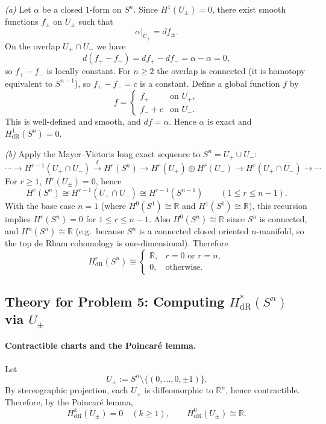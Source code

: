 \documentclass[12pt,a4paper]{article}
\theoremstyle{plain}
\theoremstyle{definition}      %
\begin{document}
	\smallskip
	\textit{(a)} Let $\alpha$ be a closed $1$-form on $S^n$. Since $H^1(U_\pm)=0$,
	there exist smooth functions $f_\pm$ on $U_\pm$ such that
	\[
	\alpha|_{U_\pm}=df_\pm.
	\]
	On the overlap $U_+\cap U_-$ we have
	\[
	d(f_+-f_-)=df_+-df_-=\alpha-\alpha=0,
	\]
	so $f_+-f_-$ is locally constant. For $n\ge 2$ the overlap is connected (it is homotopy equivalent to $S^{n-1}$),
	so $f_+-f_-=c$ is a constant. Define a global function $f$ by
	\[
	f=
	\begin{cases}
		f_+ & \text{on }U_+,\\
		f_-+c & \text{on }U_-.
	\end{cases}
	\]
	This is well-defined and smooth, and $df=\alpha$. Hence $\alpha$ is exact and $H^1_{\mathrm{dR}}(S^n)=0$.
	
	\smallskip
	\textit{(b)} Apply the Mayer--Vietoris long exact sequence to $S^n=U_+\cup U_-$:
	\[
	\cdots \to H^{r-1}(U_+\cap U_-)\xrightarrow{\delta}
	H^r(S^n)\to H^r(U_+)\oplus H^r(U_-)\to H^r(U_+\cap U_-)\to \cdots
	\]
	For $r\ge 1$, $H^r(U_\pm)=0$, hence
	\[
	H^r(S^n)\cong H^{r-1}(U_+\cap U_-)\cong H^{r-1}(S^{n-1})
	\qquad (1\le r\le n-1).
	\]
	With the base case $n=1$ (where $H^0(S^1)\cong\mathbb{R}$ and $H^1(S^1)\cong\mathbb{R}$),
	this recursion implies $H^r(S^n)=0$ for $1\le r\le n-1$.
	Also $H^0(S^n)\cong\mathbb{R}$ since $S^n$ is connected, and $H^n(S^n)\cong\mathbb{R}$
	(e.g.\ because $S^n$ is a connected closed oriented $n$-manifold, so the top de Rham cohomology is one-dimensional).
	Therefore
	\[
	H^r_{\mathrm{dR}}(S^n)\cong
	\begin{cases}
		\mathbb{R}, & r=0 \text{ or } r=n,\\
		0, & \text{otherwise}.
	\end{cases}
	\]
	
	

\subsection*{Theory for Problem 5: Computing $H^*_{\mathrm{dR}}(S^n)$ via $U_\pm$}

\paragraph{Contractible charts and the Poincar\'e lemma.}
Let
\[
U_\pm := S^n\setminus\{(0,\dots,0,\pm 1)\}.
\]
By stereographic projection, each $U_\pm$ is diffeomorphic to $\mathbb{R}^n$, hence contractible.
Therefore, by the Poincar\'e lemma,
\[
H^k_{\mathrm{dR}}(U_\pm)=0 \quad (k\ge 1),
\qquad
H^0_{\mathrm{dR}}(U_\pm)\cong \mathbb{R}.
\]
\end{document}
